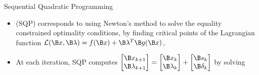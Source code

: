 \begin{frame}{Sequential Quadratic Programming}


\begin{itemize}
\item {} (SQP) corresponds to using Newton's method to solve the equality constrained optimality conditions, by finding critical points of the Lagrangian function $\mathcal{L}(\B x, \B \lambda) = f(\B x) + \B \lambda^T\B g(\B x)$,
\mdcond{
\[\nabla \mathcal{L}(\B x, \B \lambda) = \begin{bmatrix} \nabla f(\B x) + \B J_{\B g}^T(\B x) \B \lambda \\ \B g(\B x)\end{bmatrix} = \B 0\]
}

\item At each iteration, SQP computes $\begin{bmatrix} \B x_{k+1} \\ \B \lambda_{k+1}\end{bmatrix} = \begin{bmatrix} \B x_{k}\\ \B \lambda_{k}\end{bmatrix} + \begin{bmatrix} \B s_k \\ \B\delta_k \end{bmatrix}$ by solving

\end{itemize}


\end{frame}

